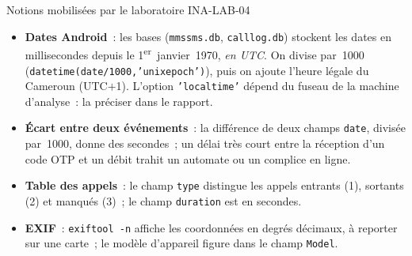 \separateur

\begin{boiteRemarque}{Notions mobilisées par le laboratoire INA-LAB-04}
\begin{itemize}
    \item \textbf{Dates Android}~: les bases (\texttt{mmssms.db},
          \texttt{calllog.db}) stockent les dates en millisecondes depuis
          le 1\textsuperscript{er}~janvier~1970, \emph{en UTC}. On divise
          par~1000 (\texttt{datetime(date/1000,'unixepoch')}), puis on
          ajoute l'heure légale du Cameroun (UTC$+$1). L'option
          \texttt{'localtime'} dépend du fuseau de la machine d'analyse~:
          la préciser dans le rapport.
    \item \textbf{Écart entre deux événements}~: la différence de deux champs
          \texttt{date}, divisée par~1000, donne des secondes~; un délai très
          court entre la réception d'un code OTP et un débit trahit un
          automate ou un complice en ligne.
    \item \textbf{Table des appels}~: le champ \texttt{type} distingue les
          appels entrants (1), sortants (2) et manqués (3)~; le champ
          \texttt{duration} est en secondes.
    \item \textbf{EXIF}~: \texttt{exiftool -n} affiche les coordonnées en
          degrés décimaux, à reporter sur une carte~; le modèle d'appareil
          figure dans le champ \texttt{Model}.
\end{itemize}
\end{boiteRemarque}

